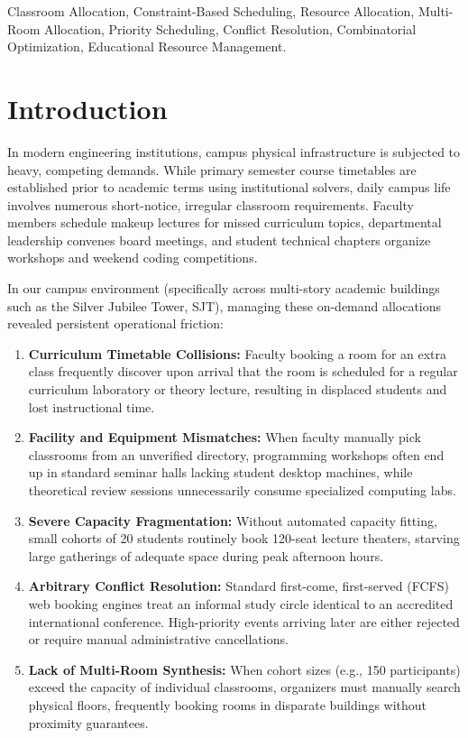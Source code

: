 \documentclass[conference]{IEEEtran}
\begin{document}
\begin{IEEEkeywords}
Classroom Allocation, Constraint-Based Scheduling, Resource Allocation, Multi-Room Allocation, Priority Scheduling, Conflict Resolution, Combinatorial Optimization, Educational Resource Management.
\end{IEEEkeywords}

\section{Introduction}
In modern engineering institutions, campus physical infrastructure is subjected to heavy, competing demands. While primary semester course timetables are established prior to academic terms using institutional solvers, daily campus life involves numerous short-notice, irregular classroom requirements. Faculty members schedule makeup lectures for missed curriculum topics, departmental leadership convenes board meetings, and student technical chapters organize workshops and weekend coding competitions.

In our campus environment (specifically across multi-story academic buildings such as the Silver Jubilee Tower, SJT), managing these on-demand allocations revealed persistent operational friction:
\begin{enumerate}
    \item \textbf{Curriculum Timetable Collisions:} Faculty booking a room for an extra class frequently discover upon arrival that the room is scheduled for a regular curriculum laboratory or theory lecture, resulting in displaced students and lost instructional time.
    \item \textbf{Facility and Equipment Mismatches:} When faculty manually pick classrooms from an unverified directory, programming workshops often end up in standard seminar halls lacking student desktop machines, while theoretical review sessions unnecessarily consume specialized computing labs.
    \item \textbf{Severe Capacity Fragmentation:} Without automated capacity fitting, small cohorts of 20 students routinely book 120-seat lecture theaters, starving large gatherings of adequate space during peak afternoon hours.
    \item \textbf{Arbitrary Conflict Resolution:} Standard first-come, first-served (FCFS) web booking engines treat an informal study circle identical to an accredited international conference. High-priority events arriving later are either rejected or require manual administrative cancellations.
    \item \textbf{Lack of Multi-Room Synthesis:} When cohort sizes (e.g., 150 participants) exceed the capacity of individual classrooms, organizers must manually search physical floors, frequently booking rooms in disparate buildings without proximity guarantees.
\end{enumerate}
\end{document}
